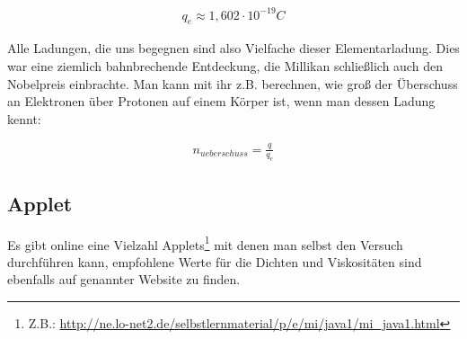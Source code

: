 \begin{align}
	q_e \approx 1,602 \cdot 10^{-19} C
\end{align}

Alle Ladungen, die uns begegnen sind also Vielfache dieser Elementarladung. Dies war eine ziemlich bahnbrechende Entdeckung, die Millikan schließlich auch den Nobelpreis einbrachte. Man kann mit ihr z.B. berechnen, wie groß der Überschuss an Elektronen über Protonen auf einem Körper ist, wenn man dessen Ladung kennt:

\begin{align}
	n_{ueberschuss} = \frac{q}{q_e}
\end{align}


\subsection{Applet}

Es gibt online eine Vielzahl Applets\footnote{Z.B.: \url{http://ne.lo-net2.de/selbstlernmaterial/p/e/mi/java1/mi_java1.html}} mit denen man selbst den Versuch durchführen kann, empfohlene Werte für die Dichten und Viskositäten sind ebenfalls auf genannter Website zu finden.




